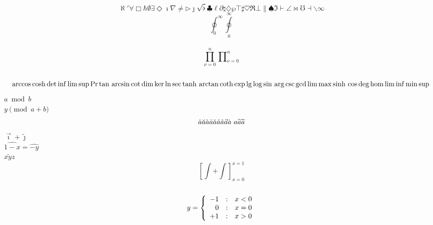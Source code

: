 \documentclass{article}
\begin{document}
	\begin{displaymath}
		\aleph \prime \forall \Box
		\hbar \emptyset \exists \Diamond
		\imath \nabla \neq \triangleright
		\jmath \surd \flat \clubsuit
		\ell \partial \natural \diamondsuit
		\wp \top \sharp \heartsuit
		\Re \bot \| \spadesuit
		\Im \vdash \angle \Join
		\mho \dashv \backslash \infty
	\end{displaymath}
	\[\oint^\infty_0 \oint\limits^\infty_0 \] \\
	\[\prod^n_{\nu=0} \prod\nolimits^n_{\nu=0} \] \\
	\begin{displaymath}
		\arccos \cosh \det \inf \limsup \Pr \tan \\
		\arcsin \cot \dim \ker \ln \sec \tanh \\
		\arctan \coth \exp \lg \log \sin \\
		\arg \csc \gcd \lim \max \sinh \\
		\cos \deg \hom \liminf \min \sup \\
	\end{displaymath}
	$ a \bmod b$ \\
	$ y \pmod{a+b}$
	\begin{displaymath}
		\hat{a} \breve{a} \grave{a} \bar{a} \\
		\check{a} \acute{a} \tilde{a} \vec{a} \\
		\dot{a} \ {a} \\
		\widehat{a} \widetilde{a} \\
	\end{displaymath}
	$\vec{\imath} + \tilde{\jmath}$ \\
	$\widehat{1-x}=\widehat{-y}$ \\
	$\widetilde{xyz}$ \\
	\[ \left[ \int + \int \right]_{x=0}^{x=1} \] \\
	\[ y= \left\{\begin{array}{r@{\quad:\quad}l}-1 & x < 0 \\ 0 & x=0 \\ +1 & x > 0 \end{array} \right.\] \\
\end{document}
